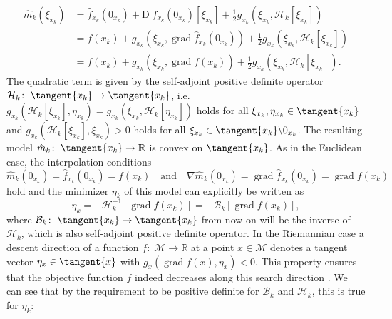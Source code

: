 \begin{equation*}
    \begin{split}
        \hat{m}_k(\xi_{x_k}) & = \hat{f}_{x_k} (0_{x_k}) + \mathrm{D} \; \hat{f}_{x_k} (0_{x_k}) [\xi_{x_k}] + \frac{1}{2} g_{x_k} (\xi_{x_k}, \mathcal{H}_k[\xi_{x_k}]) \\
        & = f(x_k) + g_{x_k} (\xi_{x_k}, \operatorname{grad} \hat{f}_{x_k} (0_{x_k})) + \frac{1}{2} g_{x_k} (\xi_{x_k}, \mathcal{H}_k[\xi_{x_k}]) \\
        & = f(x_k) + g_{x_k} (\xi_{x_k}, \operatorname{grad} f(x_k)) + \frac{1}{2} g_{x_k} (\xi_{x_k}, \mathcal{H}_k[\xi_{x_k}]).
    \end{split}
\end{equation*}
The quadratic term is given by the self-adjoint positive definite operator $\mathcal{H}_k \colon \; \tangent{x_k} \to \tangent{x_k}$, i.e. $g_{x_k} (\mathcal{H}_{k} [\xi_{x_k}], \eta_{x_k}) = g_{x_k} (\xi_{x_k}, \mathcal{H}_{k} [\eta_{x_k}])$ holds for all $\xi_{x_k}, \eta_{x_k} \in \tangent{x_k}$ and $g_{x_k} (\mathcal{H}_{k} [\xi_{x_k}], \xi_{x_k}) > 0$ holds for all $\xi_{x_k} \in \tangent{x_k} \backslash 0_{x_k}$. The resulting model $\hat{m}_k \colon \; \tangent{x_k} \to \mathbb{R}$ is convex on $\tangent{x_k}$. As in the Euclidean case, the interpolation conditions 
\begin{equation*}
    \hat{m}_k(0_{x_k}) = \hat{f}_{x_k} (0_{x_k}) = f(x_k) \quad \text{and} \quad \nabla \hat{m}_k(0_{x_k}) = \operatorname{grad} \hat{f}_{x_k} (0_{x_k}) = \operatorname{grad} f(x_k)
\end{equation*}
hold and the minimizer $\eta_k$ of this model can explicitly be written as
\begin{equation}\label{RiemannianDescentDirection}
    \eta_k = -\mathcal{H}^{-1}_k [\operatorname{grad} f(x_k)] = -\mathcal{B}_k [\operatorname{grad} f(x_k)],
\end{equation}
where $\mathcal{B}_k \colon \; \tangent{x_k} \to \tangent{x_k}$ from now on will be the inverse of $\mathcal{H}_k$, which is also self-adjoint positive definite operator. In the Riemannian case a descent direction of a function $f \colon \; \mathcal{M} \to \mathbb{R}$ at a point $x \in \mathcal{M}$ denotes a tangent vector $\eta_x \in \tangent{x}$ with $g_x (\operatorname{grad} f(x), \eta_x) < 0$. This property ensures that the objective function $f$ indeed decreases along this search direction \cite[p.~5]{RingWirth:2012}. We can see that by the requirement to be positive definite for $\mathcal{B}_k$ and $\mathcal{H}_k$, this is true for $\eta_k$:

